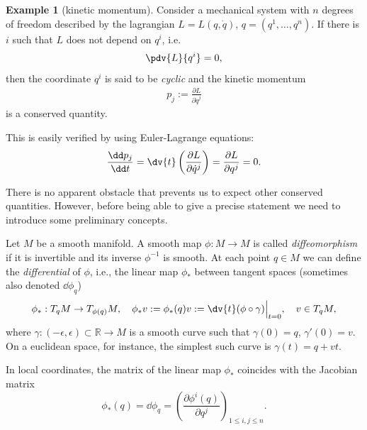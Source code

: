 \documentclass[english,fontsize=11pt,paper=b5]{scrbook}
\theoremstyle{definition}
\newtheorem{example}{Example}[chapter]
\begin{document}
    \begin{example}[kinetic momentum]\label{ex:linearm}
      Consider a mechanical system with $n$ degrees of freedom described by the lagrangian $L=L(q,\dot q)$, $q=(q^1,\ldots,q^n)$.
      If there is $i$ such that $L$ does not depend on $q^i$, i.e.
      \begin{eqnarray}
        \pdv{L}{q^i} = 0,
      \end{eqnarray}
      then the coordinate $q^i$ is said to be \emph{cyclic} and the kinetic momentum
      \begin{eqnarray}
        p_j := \frac{\partial L}{\partial\dot q^j}
      \end{eqnarray}
      is a conserved quantity.

      This is easily verified by using Euler-Lagrange equations:
      \begin{eqnarray}
        \frac{\dd p_j}{\dd t} =
        \dv{t} \left(\frac{\partial L}{\partial \dot q^j}\right)=
        \frac{\partial L}{\partial q^j} = 0.
      \end{eqnarray}
    \end{example}

    There is no apparent obstacle that prevents us to expect other conserved quantities. However, before being able to give a precise statement we need to introduce some preliminary concepts.

    Let $M$ be a smooth manifold. A smooth map $\phi : M \to M$ is called \emph{diffeomorphism} if it is invertible and its inverse $\phi^{-1}$ is smooth. At each point $q\in M$ we can define the \emph{differential} of $\phi$, i.e., the linear map $\phi_*$ between tangent spaces (sometimes also denoted $\dd\phi_q$)
    \begin{equation}
      \phi_*: T_q M \to T_{\phi(q)} M,
      \quad \phi_* v := \phi_*(q) v := \dv{t} (\phi \circ \gamma) \Big|_{t=0},
      \quad v\in T_q M,
    \end{equation}
    where $\gamma:(-\epsilon, \epsilon)\subset\mathbb{R} \to M$ is a smooth curve such that $\gamma(0)=q$, $\gamma'(0) = v$.
    On a euclidean space, for instance, the simplest such curve is $\gamma(t) = q + v t$.

    In local coordinates, the matrix of the linear map $\phi_*$ coincides with the Jacobian matrix
    \begin{equation}
      \phi_*(q) = \dd \phi_q = \left(\frac{\partial \phi^i(q)}{\partial q^j}\right)_{1\leq i,j\leq n}.
    \end{equation}
\end{document}

